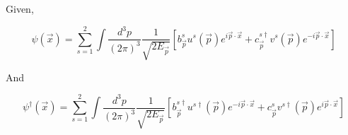 \documentclass[12pt, letterpaper]{article}
\newcommand*{\1}{\hspace{1pt}}
\begin{document}
Given,

\begin{equation}
    \psi (\overrightarrow{x} ) = \sum_{s = 1}^{2} \int \frac{d ^{3} p}{(2 \pi) ^{3}} \frac{1}{\sqrt{2 E _{\overrightarrow{p}}}} \left[b^{s} _{\overrightarrow{p}}u^{s}(\overrightarrow{p}) e ^{i \overrightarrow{p} \cdot \overrightarrow{x}} + c^{s \dagger} _{\overrightarrow{p}}v^{s}(\overrightarrow{p}) e ^{ - i \overrightarrow{p} \cdot \overrightarrow{x}}\right]  
\end{equation}

And

\begin{equation}
    \psi ^{\dagger} (\overrightarrow{x} ) = \sum_{s = 1}^{2} \int \frac{d ^{3} p}{(2 \pi) ^{3}} \frac{1}{\sqrt{2 E _{\overrightarrow{p}}}} \left[b^{s \dagger} _{\overrightarrow{p}}u^{s \dagger}(\overrightarrow{p}) e ^{-i \overrightarrow{p} \cdot \overrightarrow{x}} + c^{s} _{\overrightarrow{p}}v^{s \dagger}(\overrightarrow{p}) e ^{i \overrightarrow{p} \cdot \overrightarrow{x}}\right]  
\end{equation}
\end{document}
